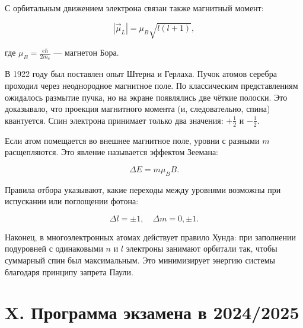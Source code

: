 \documentclass[12pt]{article}
\begin{document}
С орбитальным движением электрона связан также магнитный момент:

$$
|\vec{\mu}_L| = \mu_B \sqrt{l(l+1)},
$$

где $\mu_B = \frac{e\hbar}{2m_e}$ — магнетон Бора.

В 1922 году был поставлен опыт Штерна и Герлаха. Пучок атомов серебра проходил через неоднородное магнитное поле. По классическим представлениям ожидалось размытие пучка, но на экране появлялись две чёткие полоски. Это доказывало, что проекция магнитного момента (и, следовательно, спина) квантуется. Спин электрона принимает только два значения: $+\frac{1}{2}$ и $-\frac{1}{2}$.

Если атом помещается во внешнее магнитное поле, уровни с разными $m$ расщепляются. Это явление называется эффектом Зеемана:

$$
\Delta E = m \mu_B B.
$$

Правила отбора указывают, какие переходы между уровнями возможны при испускании или поглощении фотона:

$$
\Delta l = \pm 1, \quad \Delta m = 0, \pm 1.
$$

Наконец, в многоэлектронных атомах действует правило Хунда: при заполнении подуровней с одинаковыми $n$ и $l$ электроны занимают орбитали так, чтобы суммарный спин был максимальным. Это минимизирует энергию системы благодаря принципу запрета Паули.

\clearpage

\section{X. Программа экзамена в 2024/2025}
\end{document}

